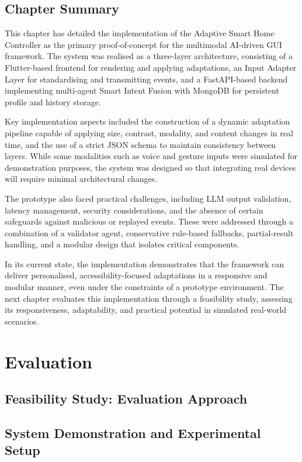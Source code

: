 \documentclass[openany]{book}
\begin{document}
\section{Chapter Summary}
This chapter has detailed the implementation of the Adaptive Smart Home Controller as the primary proof-of-concept for the multimodal AI-driven GUI framework. The system was realised as a three-layer architecture, consisting of a Flutter-based frontend for rendering and applying adaptations, an Input Adapter Layer for standardising and transmitting events, and a FastAPI-based backend implementing multi-agent Smart Intent Fusion with MongoDB for persistent profile and history storage.

Key implementation aspects included the construction of a dynamic adaptation pipeline capable of applying size, contrast, modality, and content changes in real time, and the use of a strict JSON schema to maintain consistency between layers. While some modalities such as voice and gesture inputs were simulated for demonstration purposes, the system was designed so that integrating real devices will require minimal architectural changes.

The prototype also faced practical challenges, including LLM output validation, latency management, security considerations, and the absence of certain safeguards against malicious or replayed events. These were addressed through a combination of a validator agent, conservative rule-based fallbacks, partial-result handling, and a modular design that isolates critical components.

In its current state, the implementation demonstrates that the framework can deliver personalised, accessibility-focused adaptations in a responsive and modular manner, even under the constraints of a prototype environment. The next chapter evaluates this implementation through a feasibility study, assessing its responsiveness, adaptability, and practical potential in simulated real-world scenarios.

\chapter{Evaluation}
\section{Feasibility Study: Evaluation Approach}
\section{System Demonstration and Experimental Setup}
\end{document}
